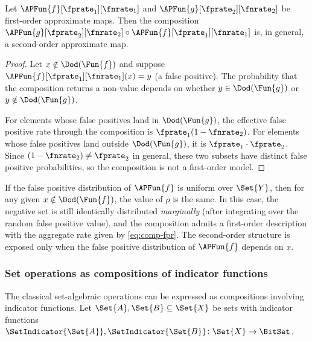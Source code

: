 \documentclass[ ../main.tex]{subfiles}
\begin{document}
\begin{lemma}
\label{prop:higher-order}
Let $\APFun{f}[\fprate_1][\fnrate_1]$ and
$\APFun{g}[\fprate_2][\fnrate_2]$ be first-order approximate maps.
Then the composition
$\APFun{g}[\fprate_2][\fnrate_2] \circ
 \APFun{f}[\fprate_1][\fnrate_1]$
is, in general, a second-order approximate map.
\end{lemma}
\begin{proof}
Let $x \notin \Dod(\Fun{f})$ and suppose
$\APFun{f}[\fprate_1][\fnrate_1](x) = y$ (a false positive).
The probability that the composition returns a non-\Nothing value
depends on whether $y \in \Dod(\Fun{g})$ or $y \notin \Dod(\Fun{g})$.

For elements whose false positives land in $\Dod(\Fun{g})$, the effective
false positive rate through the composition is
$\fprate_1(1-\fnrate_2)$.
For elements whose false positives land outside $\Dod(\Fun{g})$, it is
$\fprate_1 \cdot \fprate_2$.
Since $(1-\fnrate_2) \neq \fprate_2$ in general, these two subsets have
distinct false positive probabilities, so the composition is not a
first-order model.
\end{proof}

\begin{remark}
If the false positive distribution of $\APFun{f}$ is uniform over
$\Set{Y}$, then for any given $x \notin \Dod(\Fun{f})$, the value of
$\rho$ is the same.  In this case, the negative set is still
identically distributed \emph{marginally} (after integrating over the
random false positive value), and the composition admits a
first-order description with the aggregate rate given by
\cref{eq:comp-fpr}.  The second-order structure is exposed only when
the false positive distribution of $\APFun{f}$ depends on $x$.
\end{remark}

\subsubsection{Set operations as compositions of indicator functions}

The classical set-algebraic operations can be expressed as compositions involving indicator functions.
Let $\Set{A}, \Set{B} \subseteq \Set{X}$ be sets with indicator
functions $\SetIndicator{\Set{A}}, \SetIndicator{\Set{B}} \colon
\Set{X} \to \BitSet$.
\end{document}

